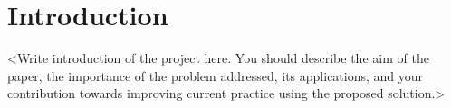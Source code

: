 \section{Introduction}
\label{sec:introduction}

<Write introduction of the project here. You should describe the aim of the
paper, the importance of the problem addressed, its applications, and your
contribution towards improving current practice using the proposed solution.>

